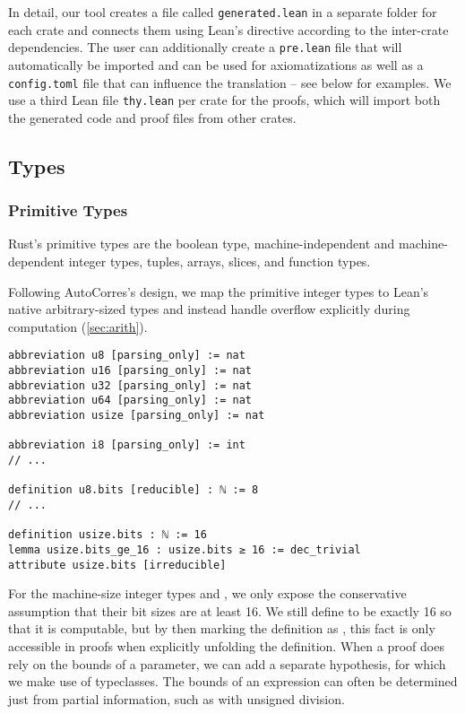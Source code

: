 In detail, our tool creates a file called \verb!generated.lean! in a separate
folder for each crate and connects them using Lean's  directive
according to the inter-crate dependencies. The user can additionally create a
\verb!pre.lean! file that will automatically be imported and can be used for
axiomatizations as well as a \verb!config.toml! file that can influence the
translation -- see below for examples. We use a third Lean file \verb!thy.lean! per crate
for the proofs, which will import both the generated code and proof files from
other crates.

\subsection{Types}

\subsubsection{Primitive Types}
\label{sec:prim}

Rust's primitive types are the boolean type, machine-independent and machine-dependent integer
types, tuples, arrays, slices, and function types.

Following AutoCorres's design, we map the primitive integer types to
Lean's native arbitrary-sized types and instead handle overflow explicitly
during computation (\autoref{sec:arith}).

\begin{verbatim}
abbreviation u8 [parsing_only] := nat
abbreviation u16 [parsing_only] := nat
abbreviation u32 [parsing_only] := nat
abbreviation u64 [parsing_only] := nat
abbreviation usize [parsing_only] := nat

abbreviation i8 [parsing_only] := int
// ...

definition u8.bits [reducible] : ℕ := 8
// ...

definition usize.bits : ℕ := 16
lemma usize.bits_ge_16 : usize.bits ≥ 16 := dec_trivial
attribute usize.bits [irreducible]
\end{verbatim}

For the machine-size integer types  and , we only expose
the conservative assumption that their bit sizes are at least 16. We still define
 to be exactly 16 so that it is computable, but by then marking
the definition as \rust{[irreducible]}, this fact is only accessible in proofs
when explicitly unfolding the definition.
When a proof does rely on the bounds of a parameter, we can add a separate
hypothesis, for which we make use of typeclasses. The bounds of an expression
can often be determined just from partial information, such as with unsigned division.


